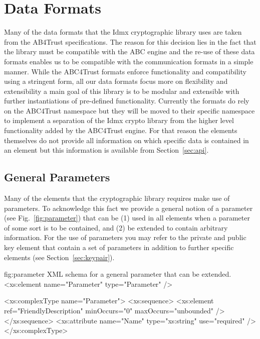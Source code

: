 
\section{Data Formats}
\label{sec:dataFormats}

Many of the data formats that the Idmx cryptographic library uses are taken from the AB4Trust specifications.
The reason for this decision lies in the fact that the library must be compatible with the ABC engine and
the re-use of these data formats enables us to be compatible with the communication formats in a simple manner.
%
While the ABC4Trust formats enforce functionality and compatibility using a stringent form, all our data formats 
focus more on flexibility and extensibility a main goal of this library is to be modular and extensible with 
further instantiations of pre-defined functionality.
%
Currently the formats do rely on the ABC4Trust namespace but they will be moved to their specific namespace to
implement a separation of the Idmx crypto library from the higher level functionality added by the ABC4Trust 
engine.
%
For that reason the elements themselves do not provide all information on which specific
data is contained in an element but this information is available from Section~\ref{sec:api}.



\subsection{General Parameters}

Many of the elements that the cryptographic library requires make use of parameters.
%
To acknowledge this fact we provide a general notion of a parameter (see Fig.~\ref{fig:parameter}) that can be (1) used in all 
elements when a parameter of 
some sort is to be contained, and  (2) be extended to contain arbitrary information.
%
For the use of parameters you may refer to the private and public key element that contain a set of parameters in addition to 
further specific elements (see Section~\ref{sec:keypair}).


\begin{xml}
{fig:parameter}
{XML schema for a general parameter that can be extended.}
<xs:element name="Parameter" type="Parameter" />

<xs:complexType name="Parameter">
  <xs:sequence>
    <xs:element ref="FriendlyDescription" minOccurs="0" 
      maxOccurs="unbounded" />
  </xs:sequence>
  <xs:attribute name="Name" type="xs:string" use="required" />
</xs:complexType>
\end{xml}

